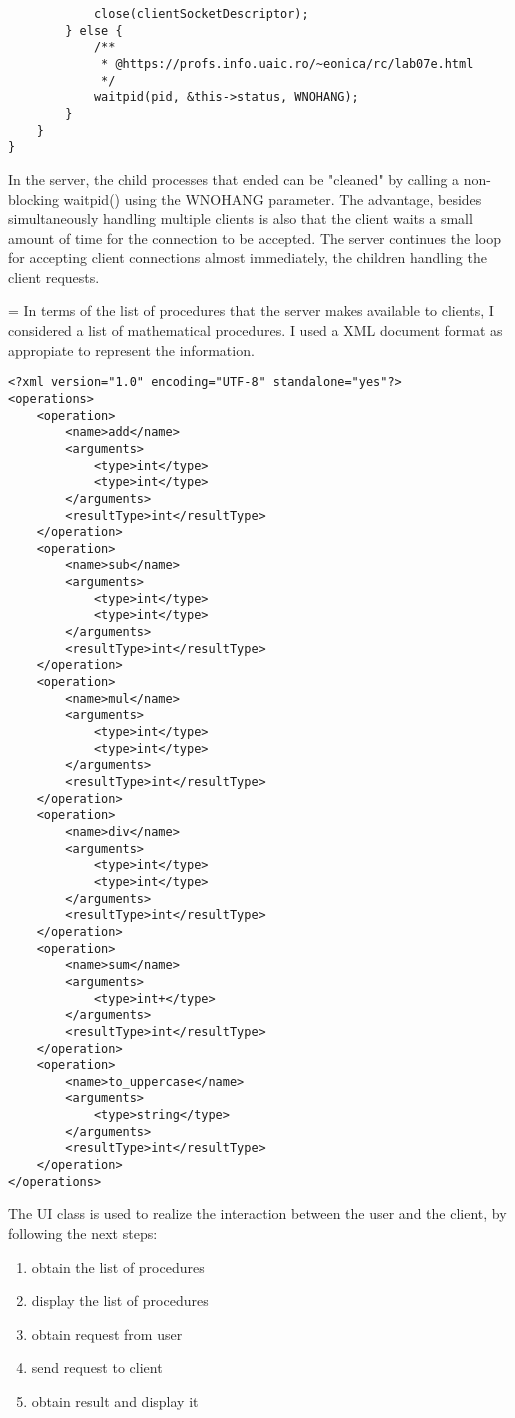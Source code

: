\documentclass{llncs}
\begin{document}
\begin{lstlisting}
            close(clientSocketDescriptor);
        } else {
            /**
             * @https://profs.info.uaic.ro/~eonica/rc/lab07e.html
             */
            waitpid(pid, &this->status, WNOHANG);
        }
    }
}
\end{lstlisting}
In the server, the child processes that ended can be "cleaned" by calling a non-blocking waitpid() using the WNOHANG parameter.
The advantage, besides simultaneously handling multiple clients is also that the client waits a small amount of time for the connection to be accepted. The server continues the loop for accepting client connections almost immediately, the children handling the client requests. 

\parskip = \baselineskip  %
In terms of the list of procedures that the server makes available to clients, I considered a list of mathematical procedures. I used a XML document format as appropiate to represent the information.

 \begin{lstlisting}
<?xml version="1.0" encoding="UTF-8" standalone="yes"?>
<operations>
    <operation>
        <name>add</name>
        <arguments>
            <type>int</type>
            <type>int</type>
        </arguments>
        <resultType>int</resultType>
    </operation>
    <operation>
        <name>sub</name>
        <arguments>
            <type>int</type>
            <type>int</type>
        </arguments>
        <resultType>int</resultType>
    </operation>
    <operation>
        <name>mul</name>
        <arguments>
            <type>int</type>
            <type>int</type>
        </arguments>
        <resultType>int</resultType>
    </operation>
    <operation>
        <name>div</name>
        <arguments>
            <type>int</type>
            <type>int</type>
        </arguments>
        <resultType>int</resultType>
    </operation>
    <operation>
        <name>sum</name>
        <arguments>
            <type>int+</type>
        </arguments>
        <resultType>int</resultType>
    </operation>
    <operation>
        <name>to_uppercase</name>
        <arguments>
            <type>string</type>
        </arguments>
        <resultType>int</resultType>
    </operation>
</operations>
 \end{lstlisting}


The UI class is used to realize the interaction between the user and the client, by following the next steps:\begin{enumerate}
				\item obtain the list of procedures
				\item display the list of procedures
 				\item obtain request from user
				\item send request to client
				\item obtain result and display it
			\end{enumerate}
\end{document}
